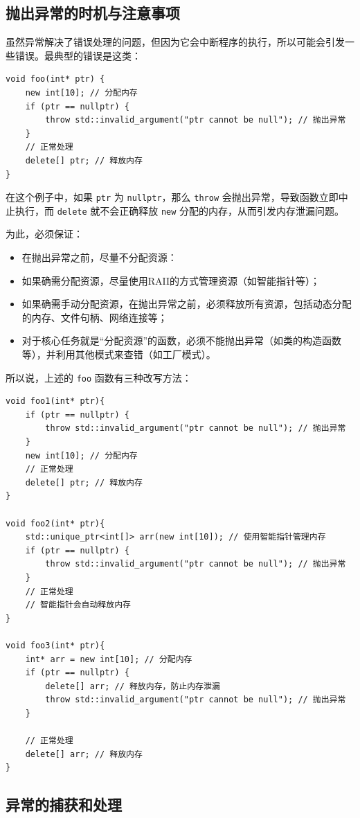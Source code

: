 \subsection{抛出异常的时机与注意事项}

虽然异常解决了错误处理的问题，但因为它会中断程序的执行，所以可能会引发一些错误。最典型的错误是这类：
\begin{verbatim}
void foo(int* ptr) {
    new int[10]; // 分配内存
    if (ptr == nullptr) {
        throw std::invalid_argument("ptr cannot be null"); // 抛出异常
    }
    // 正常处理
    delete[] ptr; // 释放内存
}
\end{verbatim}
在这个例子中，如果 \verb|ptr| 为 \verb|nullptr|，那么 \verb|throw| 会抛出异常，导致函数立即中止执行，而 \verb|delete| 就不会正确释放 \verb|new| 分配的内存，从而引发内存泄漏问题。

为此，必须保证：
\begin{itemize}
    \item 在抛出异常之前，尽量不分配资源：
    \item 如果确需分配资源，尽量使用RAII的方式管理资源（如智能指针等）；
    \item 如果确需手动分配资源，在抛出异常之前，必须释放所有资源，包括动态分配的内存、文件句柄、网络连接等；
    \item 对于核心任务就是“分配资源”的函数，必须不能抛出异常（如类的构造函数等），并利用其他模式来查错（如工厂模式）。
\end{itemize}
所以说，上述的 \verb|foo| 函数有三种改写方法：
\begin{verbatim}
void foo1(int* ptr){
    if (ptr == nullptr) {
        throw std::invalid_argument("ptr cannot be null"); // 抛出异常
    }
    new int[10]; // 分配内存
    // 正常处理
    delete[] ptr; // 释放内存
}

void foo2(int* ptr){
    std::unique_ptr<int[]> arr(new int[10]); // 使用智能指针管理内存
    if (ptr == nullptr) {
        throw std::invalid_argument("ptr cannot be null"); // 抛出异常
    }
    // 正常处理
    // 智能指针会自动释放内存
}

void foo3(int* ptr){
    int* arr = new int[10]; // 分配内存
    if (ptr == nullptr) {
        delete[] arr; // 释放内存，防止内存泄漏
        throw std::invalid_argument("ptr cannot be null"); // 抛出异常
    }
    
    // 正常处理
    delete[] arr; // 释放内存
}
\end{verbatim}

\subsection{异常的捕获和处理}

